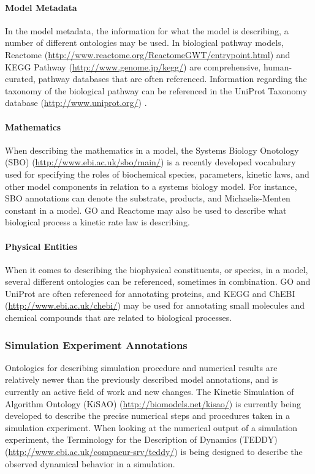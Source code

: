\paragraph{Model Metadata}

In the model metadata, the information for what the model is describing,
a number of different ontologies may be used. In biological pathway
models, Reactome
(\url{http://www.reactome.org/ReactomeGWT/entrypoint.html})
\autocite{joshi2005reactome} and KEGG Pathway
(\url{http://www.genome.jp/kegg/}) \autocite{ogata1999kegg} are
comprehensive, human-curated, pathway databases that are often
referenced. Information regarding the taxonomy of the biological pathway
can be referenced in the UniProt Taxonomy database
(\url{http://www.uniprot.org/}) \autocite{bairoch2005universal}.

\paragraph{Mathematics}

When describing the mathematics in a model, the Systems Biology
Onotology (SBO) (\url{http://www.ebi.ac.uk/sbo/main/})
\autocite{le2006model} is a recently developed vocabulary used for
specifying the roles of biochemical species, parameters, kinetic laws,
and other model components in relation to a systems biology model. For
instance, SBO annotations can denote the substrate, products, and
Michaelis-Menten constant in a model. GO and Reactome may also be used
to describe what biological process a kinetic rate law is describing.

\paragraph{Physical Entities}

When it comes to describing the biophysical constituents, or species, in
a model, several different ontologies can be referenced, sometimes in
combination. GO and UniProt are often referenced for annotating
proteins, and KEGG and ChEBI (\url{http://www.ebi.ac.uk/chebi/})
\autocite{degtyarenko2008chebi} may be used for annotating small
molecules and chemical compounds that are related to biological
processes.

\subsubsection{Simulation Experiment Annotations}

Ontologies for describing simulation procedure and numerical results are
relatively newer than the previously described model annotations, and is
currently an active field of work and new changes. The Kinetic
Simulation of Algorithm Ontology (KiSAO)
(\url{http://biomodels.net/kisao/}) is currently being developed to
describe the precise numerical steps and procedures taken in a
simulation experiment. When looking at the numerical output of a
simulation experiment, the Terminology for the Description of Dynamics
(TEDDY) (\url{http://www.ebi.ac.uk/compneur-srv/teddy/})
\autocite{courtot2011controlled} is being designed to describe the
observed dynamical behavior in a simulation.


